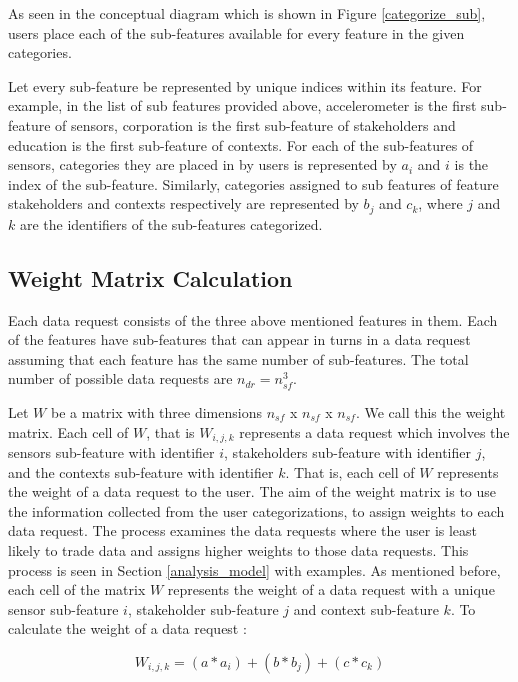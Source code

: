 As seen in the conceptual diagram which is shown in Figure \ref{categorize_sub}, users place each of the sub-features available for every feature in the given categories.

Let every sub-feature be represented by unique indices within its feature. For example, in the list of sub features provided above, accelerometer is the first sub-feature of sensors, corporation is the first sub-feature of stakeholders and education is the first sub-feature of contexts. For each of the sub-features of sensors, categories they are placed in by users is represented by $a_{i}$ and $i$ is the index
of the sub-feature. Similarly, categories assigned to sub features of feature stakeholders and contexts respectively are represented by $b_{j}$ and $c_{k}$, where $j$ and $k$ are the identifiers of the sub-features categorized.

\subsection{Weight Matrix Calculation}
Each data request consists of the three above mentioned features in them. Each of the features have \numsubfeatures sub-features that can appear in turns in a data request assuming that each feature has the same number of sub-features. The total number of possible data requests are $n_{dr} =  n_{sf}^3$.

Let $W$  be a matrix with three dimensions $n_{sf}$ x $n_{sf}$ x $n_{sf}$. We call this the weight matrix.
Each cell of $W$, that is $W_{i,j,k}$ represents a data request which involves the sensors sub-feature with identifier $i$, stakeholders sub-feature with identifier $j$,
and the contexts sub-feature with identifier $k$. That is, each cell of $W$ represents the weight of a data request to the user. The aim of the weight matrix is to use the information collected from the user categorizations, to assign weights to each data request. The process examines the
data requests where the user is least likely to trade data and assigns higher weights to those data requests. This process is seen in
Section \ref{analysis_model} with examples. As mentioned before, each cell of the matrix $W$ represents the weight of a data request with a unique sensor sub-feature $i$, stakeholder sub-feature $j$ and context sub-feature $k$. To calculate the weight of a data request :

\begin{equation}
W_{i,j,k} = (a*a_{i}) + (b*b_{j}) + (c*c_{k})
\end{equation}

